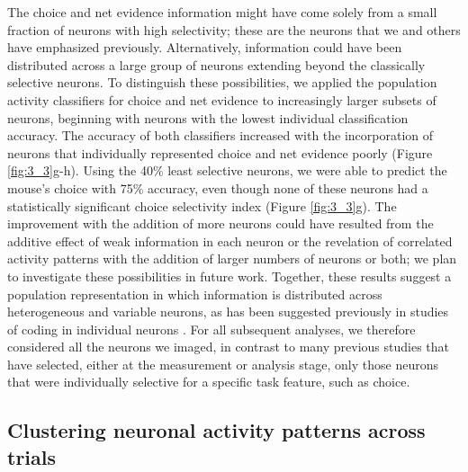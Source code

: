 \bigskip
The choice and net evidence information might have come solely from a small fraction of neurons with high selectivity; these are the neurons that we and others have emphasized previously. Alternatively, information could have been distributed across a large group of neurons extending beyond the classically selective neurons. To distinguish these possibilities, we applied the population activity classifiers for choice and net evidence to increasingly larger subsets of neurons, beginning with neurons with the lowest individual classification accuracy. The accuracy of both classifiers increased with the incorporation of neurons that individually represented choice and net evidence poorly (Figure \ref{fig:3_3}g-h). Using the 40\% least selective neurons, we were able to predict the mouse’s choice with 75\% accuracy, even though none of these neurons had a statistically significant choice selectivity index (Figure \ref{fig:3_3}g). The improvement with the addition of more neurons could have resulted from the additive effect of weak information in each neuron or the revelation of correlated activity patterns with the addition of larger numbers of neurons or both; we plan to investigate these possibilities in future work. Together, these results suggest a population representation in which information is distributed across heterogeneous and variable neurons, as has been suggested previously in studies of coding in individual neurons \citep{Meister:2013ca, Park:2014co, Jun:2010kj, Raposo:2014df, Mante:2013ie, Rigotti:2013bo, Maimon:2009hg, Churchland:2010he}. For all subsequent analyses, we therefore considered all the neurons we imaged, in contrast to many previous studies that have selected, either at the measurement or analysis stage, only those neurons that were individually selective for a specific task feature, such as choice.

\subsection{Clustering neuronal activity patterns across trials} \label{sec:chap3_clustering}

